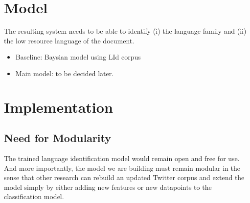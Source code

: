 \documentclass[11pt]{article}
\begin{document}
\section{Model}

The resulting system needs to be able to identify (i) the language family and (ii) the low resource language of the document.

\begin{itemize}
\item Baseline: Baysian model using LId corpus
\item Main model: to be decided later.
\end{itemize}

\section{Implementation}

\subsection{Need for Modularity}

The trained language identification model would remain open and free for use. And more importantly, the model we are building must remain modular in the sense that other research can rebuild an updated Twitter corpus and extend the model simply by either adding new features or new datapoints to the classification model.
\end{document}
